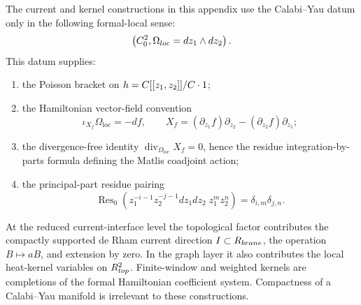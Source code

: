 \begin{prop}
\label{prop:app-local-unimodular-current-kernel-input}
  The current and kernel constructions in this appendix use the
  Calabi--Yau datum only in the following formal-local sense:
  \[
    \left(C^2_0,\Omega_{loc}=dz_1\wedge dz_2\right).
  \]
  This datum supplies:
  \begin{enumerate}
    \item the Poisson bracket on
    \(h=C[[z_1,z_2]]/C\cdot1\);
    \item the Hamiltonian vector-field convention
    \[
      \iota_{X_f}\Omega_{\mathrm{loc}}=-df,\qquad
      X_f=(\partial_{z_1}f)\partial_{z_2}
        -(\partial_{z_2}f)\partial_{z_1};
    \]
    \item the divergence-free identity
    \(\operatorname{div}_{\Omega_{\mathrm{loc}}}X_f=0\), hence the
    residue integration-by-parts formula defining the Matlis coadjoint
    action;
    \item the principal-part residue pairing
    \[
      \operatorname{Res}_0
      \left(z_1^{-i-1}z_2^{-j-1}dz_1dz_2\;z_1^mz_2^n\right)
      =\delta_{i,m}\delta_{j,n}.
    \]
  \end{enumerate}
  At the reduced current-interface level the topological factor
  contributes the compactly supported de Rham current direction
  \(I\subset R_{brane}\), the operation \(B\mapsto aB\), and
  extension by zero.  In the graph layer it also contributes the local
  heat-kernel variables on \(R^2_{top}\).  Finite-window and
  weighted kernels are completions of the formal Hamiltonian coefficient
  system.  Compactness of a Calabi--Yau manifold is irrelevant to these
  constructions.
\end{prop}

